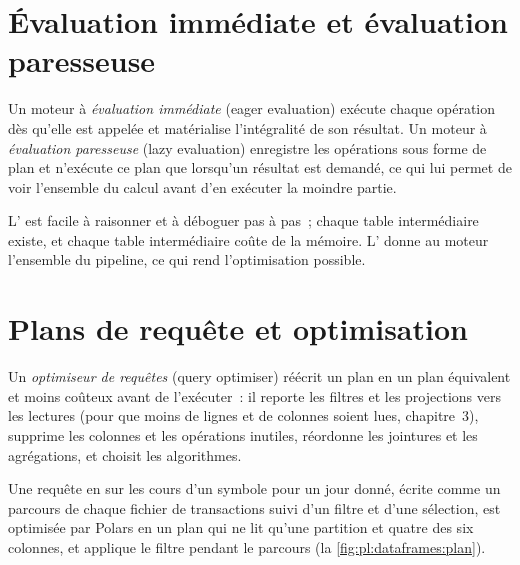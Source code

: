 \section{Évaluation immédiate et évaluation paresseuse}

\begin{definition}\label{def:pl:dataframes:eager}
Un moteur à \emph{évaluation immédiate} (eager evaluation) exécute chaque opération dès qu'elle est appelée et matérialise l'intégralité
de son résultat. Un moteur à \emph{évaluation paresseuse} (lazy evaluation) enregistre les opérations sous forme de plan et n'exécute ce plan que
lorsqu'un résultat est demandé, ce qui lui permet de voir l'ensemble du calcul avant d'en exécuter la moindre partie.
\end{definition}

L' est facile à raisonner et à déboguer pas à pas~; chaque table intermédiaire existe, et chaque table intermédiaire
coûte de la mémoire. L' donne au moteur l'ensemble du pipeline, ce qui rend l'optimisation possible.

\section{Plans de requête et optimisation}

\begin{definition}\label{def:pl:dataframes:optimiser}
Un \emph{optimiseur de requêtes} (query optimiser) réécrit un plan en un plan équivalent et moins coûteux avant de l'exécuter~: il reporte les filtres
et les projections vers les lectures (pour que moins de lignes et de colonnes soient lues, chapitre~3), supprime les colonnes et les opérations inutiles, réordonne les
jointures et les agrégations, et choisit les algorithmes.
\end{definition}

Une requête en  sur les cours d'un symbole pour un jour donné, écrite comme un parcours de chaque fichier de transactions suivi d'un filtre et d'une sélection, est
optimisée par Polars en un plan qui ne lit qu'une partition et quatre des six colonnes, et applique le filtre pendant le parcours
(la \cref{fig:pl:dataframes:plan}).


